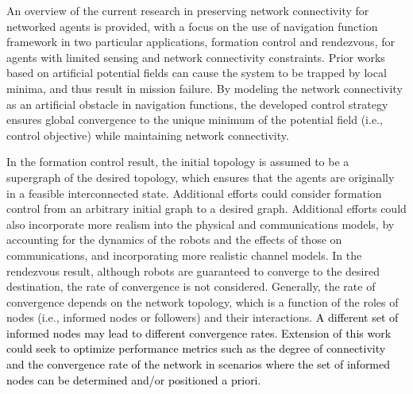 \documentclass[english]{IOS-Book-Article}
\theoremstyle{definition}
\theoremstyle{definition}
\begin{document}
An overview of the current research in preserving network connectivity
for networked agents is provided, with a focus on the use of navigation
function framework in two particular applications, formation control
and rendezvous, for agents with limited sensing and network connectivity
constraints. Prior works based on artificial potential fields can
cause the system to be trapped by local minima, and thus result in
mission failure. By modeling the network connectivity as an artificial
obstacle in navigation functions, the developed control strategy ensures
global convergence to the unique minimum of the potential field (i.e.,
control objective) while maintaining network connectivity. 

In the formation control result, the initial topology is assumed to
be a supergraph of the desired topology, which ensures that the agents
are originally in a feasible interconnected state. Additional efforts
could consider formation control from an arbitrary initial graph to
a desired graph. Additional efforts could also incorporate more realism
into the physical and communications models, by accounting for the
dynamics of the robots and the effects of those on communications,
and incorporating more realistic channel models. In the rendezvous
result, although robots are guaranteed to converge to the desired
destination, the rate of convergence is not considered. Generally,
the rate of convergence depends on the network topology, which is
a function of the roles of nodes (i.e., informed nodes or followers)
and their interactions. \textcolor{black}{A different set of informed
nodes may lead to different convergence rates. Extension of this work
could seek to optimize performance metrics such as the degree of connectivity
and the convergence rate of the network in scenarios where the set
of informed nodes can be determined and/or positioned a priori.}



\end{document}
